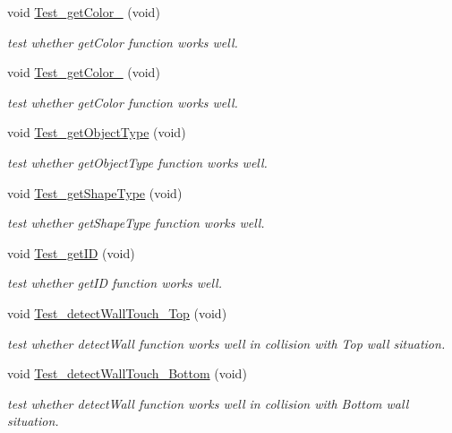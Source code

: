 \begin{DoxyCompactItemize}
void \hyperlink{classObjectTests_a8fb183a34b9af5aebee5015cebbf245c}{Test\-\_\-get\-Color\-\_} (void)
\begin{DoxyCompactList}\small\item\em test whether get\-Color function works well. \end{DoxyCompactList}\item 
void \hyperlink{classObjectTests_a938c749ad8c04ea2700bdf8b5de1b0fd}{Test\-\_\-get\-Color\-\_} (void)
\begin{DoxyCompactList}\small\item\em test whether get\-Color function works well. \end{DoxyCompactList}\item 
void \hyperlink{classObjectTests_a4cdf6a34f4a1a805a273b979883ab437}{Test\-\_\-get\-Object\-Type} (void)
\begin{DoxyCompactList}\small\item\em test whether get\-Object\-Type function works well. \end{DoxyCompactList}\item 
void \hyperlink{classObjectTests_afa6f53eb63b3d20a0d4ecc8a9135abc8}{Test\-\_\-get\-Shape\-Type} (void)
\begin{DoxyCompactList}\small\item\em test whether get\-Shape\-Type function works well. \end{DoxyCompactList}\item 
void \hyperlink{classObjectTests_a558a178a81767c856e9981ed03367b92}{Test\-\_\-get\-I\-D} (void)
\begin{DoxyCompactList}\small\item\em test whether get\-I\-D function works well. \end{DoxyCompactList}\item 
void \hyperlink{classObjectTests_ae845b006977fa7a33d73e36e77cbc59b}{Test\-\_\-detect\-Wall\-Touch\-\_\-\-Top} (void)
\begin{DoxyCompactList}\small\item\em test whether detect\-Wall function works well in collision with Top wall situation. \end{DoxyCompactList}\item 
void \hyperlink{classObjectTests_a53f3339eefc24d3026f7270d790eaefe}{Test\-\_\-detect\-Wall\-Touch\-\_\-\-Bottom} (void)
\begin{DoxyCompactList}\small\item\em test whether detect\-Wall function works well in collision with Bottom wall situation. \end{DoxyCompactList}\item 

\end{DoxyCompactItemize}
